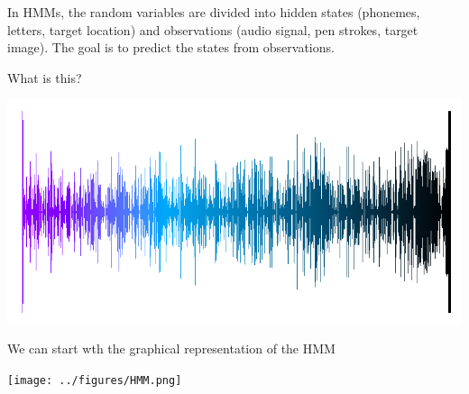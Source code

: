\documentclass[c]{beamer}
\begin{document}
\begin{frame}
  In HMMs, the random variables are divided into hidden states (phonemes, letters, target location) and observations (audio signal, pen strokes, target image). The goal is to predict the states from observations.

  What is this?
\begin{center}
  \includegraphics[width=0.7\linewidth]{../figures/SultansofSwing.png}
\end{center}
\end{frame}

\begin{frame}
We can start wth the graphical representation of the HMM
\begin{center}
  \texttt{[image: ../figures/HMM.png]}
\end{center}
\end{frame}
\end{document}
